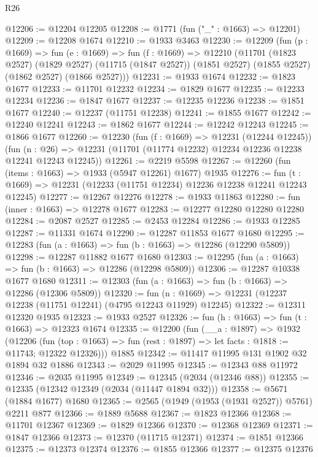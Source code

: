 \begin{lexlean}{R26}
\begin{coremodule}
@12206 := @12204 @12205
@12208 := @1771 (fun ("_" : @1663) => @12201)
@12209 := @12208 @1674
@12210 := @1933 @3463
@12230 := @12209
    (fun (p : @1669) =>
    fun (e : @1669) =>
    fun (f : @1669) =>
    @12210
      (@11701
        (@1823 @2527)
        (@1829 @2527)
        (@11715 (@1847 @2527))
        (@1851 @2527)
        (@1855 @2527)
        (@1862 @2527)
        (@1866 @2527)))
@12231 := @1933 @1674
@12232 := @1823 @1677
@12233 := @11701 @12232
@12234 := @1829 @1677
@12235 := @12233 @12234
@12236 := @1847 @1677
@12237 := @12235 @12236
@12238 := @1851 @1677
@12240 := @12237 (@11751 @12238)
@12241 := @1855 @1677
@12242 := @12240 @12241
@12243 := @1862 @1677
@12244 := @12242 @12243
@12245 := @1866 @1677
@12260 := @12230
    (fun (f : @1669) => @12231 (@12244 @12245))
    (fun (n : @26) => @12231 (@11701 (@11774 @12232) @12234 @12236 @12238 @12241 @12243 @12245))
@12261 := @2219 @5598
@12267 := @12260 (fun (items : @1663) => @1933 (@5947 @12261) @1677) @1935
@12276 := fun (t : @1669) => @12231 (@12233 (@11751 @12234) @12236 @12238 @12241 @12243 @12245)
@12277 := @12267 @12276
@12278 := @1933 @11863
@12280 := fun (inner : @1663) => @12278 @1677
@12283 := @12277 @12280 @12280 @12280
@12284 := @2087 @2527
@12285 := @2453 @12284
@12286 := @1933 @12285
@12287 := @11331 @1674
@12290 := @12287 @11853 @1677 @1680
@12295 := @12283 (fun (a : @1663) => fun (b : @1663) => @12286 (@12290 @5809))
@12298 := @12287 @11882 @1677 @1680
@12303 := @12295 (fun (a : @1663) => fun (b : @1663) => @12286 (@12298 @5809))
@12306 := @12287 @10338 @1677 @1680
@12311 := @12303 (fun (a : @1663) => fun (b : @1663) => @12286 (@12306 @5809))
@12320 := fun (n : @1669) => @12231 (@12237 @12238 (@11751 @12241) (@4795 @12243 @11929) @12245)
@12322 := @12311 @12320 @1935
@12323 := @1933 @2527
@12326 := fun (h : @1663) => fun (t : @1663) => @12323 @1674
@12335 := @12200
    (fun (__a : @1897) =>
    @1932
      (@12206
        (fun (top : @1663) => fun (rest : @1897) => let facts : @1818 := @11743; @12322 @12326)))
    @1885
@12342 := @11417 @11995 @131 @1902 @32 @1894 @32 @1886
@12343 := @2029 @11995
@12345 := @12343 @88 @11972
@12346 := @2035 @11995
@12349 := @12345 (@2034 (@12346 @88))
@12355 := @12335 (@12342 @12349 (@2034 (@11447 @1894 @32)))
@12358 := @5671 (@1884 @1677) @1680
@12365 := @2565 (@1949 (@1953 (@1931 @2527)) @5761) @2211 @877
@12366 := @1889 @5688
@12367 := @1823 @12366
@12368 := @11701 @12367
@12369 := @1829 @12366
@12370 := @12368 @12369
@12371 := @1847 @12366
@12373 := @12370 (@11715 @12371)
@12374 := @1851 @12366
@12375 := @12373 @12374
@12376 := @1855 @12366
@12377 := @12375 @12376

\end{coremodule}
\end{lexlean}

